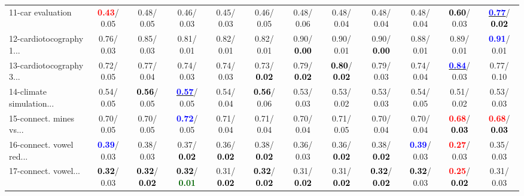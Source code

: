 \begin{table}[h]
\begin{center}
{\begin{tabular}{lc|c|c|c|c|c|c|c|c|c|c}
11-car evaluation & \textcolor{red}{\textbf{  0.43}}/  0.05 &   0.48/  0.05 &   0.46/  0.03 &   0.45/  0.03 &   0.46/  0.05 &   0.48/  0.06 &   0.48/  0.04 &   0.48/  0.04 &   0.48/  0.04 & \textcolor{black}{\textbf{  0.60}}/  0.03 & \underline{\textcolor{blue}{\textbf{  0.77}}}/\textcolor{black}{\textbf{  0.02}} \\
12-cardiotocography 1... &   0.76/  0.03 &   0.85/  0.03 &   0.81/  0.01 &   0.82/  0.01 &   0.82/  0.01 &   0.90/\textcolor{black}{\textbf{  0.00}} &   0.90/  0.01 &   0.90/\textcolor{black}{\textbf{  0.00}} &   0.88/  0.01 &   0.89/  0.01 & \textcolor{blue}{\textbf{  0.91}}/  0.01 \\
13-cardiotocography 3... &   0.72/  0.05 &   0.77/  0.04 &   0.74/  0.03 &   0.74/  0.03 &   0.73/\textcolor{black}{\textbf{  0.02}} &   0.79/\textcolor{black}{\textbf{  0.02}} & \textcolor{black}{\textbf{  0.80}}/\textcolor{black}{\textbf{  0.02}} &   0.79/  0.03 &   0.74/  0.04 & \underline{\textcolor{blue}{\textbf{  0.84}}}/  0.03 &   0.77/  0.10 \\
14-climate simulation... &   0.54/  0.05 & \textcolor{black}{\textbf{  0.56}}/  0.05 & \underline{\textcolor{blue}{\textbf{  0.57}}}/  0.05 &   0.54/  0.04 & \textcolor{black}{\textbf{  0.56}}/  0.06 &   0.53/  0.03 &   0.53/  0.02 &   0.53/  0.03 &   0.54/  0.05 &   0.51/  0.02 &   0.53/  0.03 \\ \hline
15-connect. mines vs... &   0.70/  0.05 &   0.70/  0.05 & \textcolor{blue}{\textbf{  0.72}}/  0.05 &   0.71/  0.04 &   0.71/  0.04 &   0.70/  0.04 &   0.71/  0.05 &   0.70/  0.04 &   0.70/  0.04 & \textcolor{red}{\textbf{  0.68}}/\textcolor{black}{\textbf{  0.03}} & \textcolor{red}{\textbf{  0.68}}/\textcolor{black}{\textbf{  0.03}} \\
16-connect. vowel red... & \textcolor{blue}{\textbf{  0.39}}/  0.03 &   0.38/  0.03 &   0.37/\textcolor{black}{\textbf{  0.02}} &   0.36/\textcolor{black}{\textbf{  0.02}} &   0.38/\textcolor{black}{\textbf{  0.02}} &   0.36/  0.03 &   0.36/\textcolor{black}{\textbf{  0.02}} &   0.38/\textcolor{black}{\textbf{  0.02}} & \textcolor{blue}{\textbf{  0.39}}/  0.03 & \textcolor{red}{\textbf{  0.27}}/  0.03 &   0.35/  0.03 \\
17-connect. vowel... & \textcolor{black}{\textbf{  0.32}}/  0.03 & \textcolor{black}{\textbf{  0.32}}/\textcolor{black}{\textbf{  0.02}} & \textcolor{black}{\textbf{  0.32}}/\textcolor{darkgreen}{\textbf{  0.01}} &   0.31/\textcolor{black}{\textbf{  0.02}} & \textcolor{black}{\textbf{  0.32}}/\textcolor{black}{\textbf{  0.02}} &   0.31/\textcolor{black}{\textbf{  0.02}} &   0.31/\textcolor{black}{\textbf{  0.02}} & \textcolor{black}{\textbf{  0.32}}/\textcolor{black}{\textbf{  0.02}} & \textcolor{black}{\textbf{  0.32}}/  0.03 & \textcolor{red}{\textbf{  0.25}}/\textcolor{black}{\textbf{  0.02}} &   0.31/  0.03 \\

\end{tabular}}
\end{center}
\end{table}
